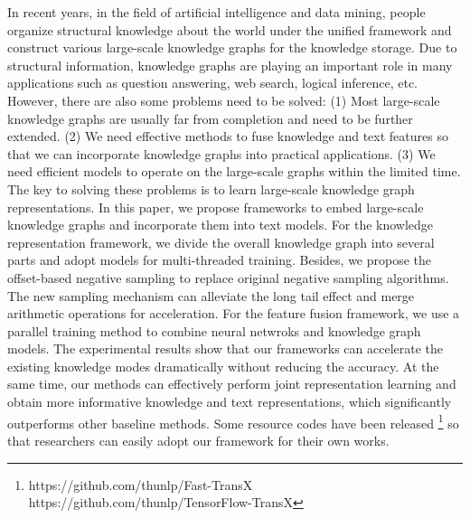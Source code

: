 \begin{eabstract}

   In recent years, in the field of artificial intelligence and data mining, people organize structural knowledge about the world under the unified framework and construct various large-scale knowledge graphs for the knowledge storage. Due to structural information, knowledge graphs are playing an important role in many applications such as question answering, web search, logical inference, etc. However, there are also some problems need to be solved: (1) Most large-scale knowledge graphs are usually far from completion and need to be further extended. (2) We need effective methods to fuse knowledge and text features so that we can incorporate knowledge graphs into practical applications. (3) We need efficient models to operate on the large-scale graphs within the limited time. The key to solving these problems is to learn large-scale knowledge graph representations. In this paper, we propose frameworks to embed large-scale knowledge graphs and incorporate them into text models. For the knowledge representation framework, we divide the overall knowledge graph into several parts and adopt models for multi-threaded training. Besides, we propose the offset-based negative sampling to replace original negative sampling algorithms. The new sampling mechanism can alleviate the long tail effect and merge arithmetic operations for acceleration. For the feature fusion framework, we use a parallel training method to combine neural netwroks and knowledge graph models. The experimental results show that our frameworks can accelerate the existing knowledge modes dramatically without reducing the accuracy. At the same time, our methods can effectively perform joint representation learning and obtain more informative knowledge and text representations, which significantly outperforms other baseline methods. Some resource codes have been released \footnote{https://github.com/thunlp/Fast-TransX \\ https://github.com/thunlp/TensorFlow-TransX} so that researchers can easily adopt our framework for their own works.

\end{eabstract}

